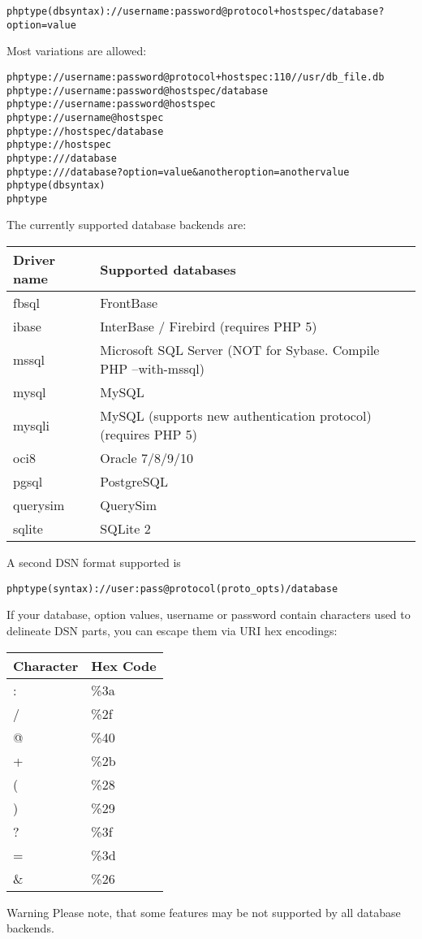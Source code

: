 \documentclass[11pt,a4paper]{report}
\begin{document}
\begin{verbatim}
phptype(dbsyntax)://username:password@protocol+hostspec/database?option=value
\end{verbatim}

Most variations are allowed:

\begin{verbatim}
phptype://username:password@protocol+hostspec:110//usr/db_file.db
phptype://username:password@hostspec/database
phptype://username:password@hostspec
phptype://username@hostspec
phptype://hostspec/database
phptype://hostspec
phptype:///database
phptype:///database?option=value&anotheroption=anothervalue
phptype(dbsyntax)
phptype
\end{verbatim}

The currently supported database backends are:

\begin{tabular}{|l|l|}
\hline
Driver name & Supported databases\\
\hline
fbsql & FrontBase\\
\hline
ibase & InterBase / Firebird (requires PHP 5)\\
\hline
mssql & Microsoft SQL Server (NOT for Sybase. Compile PHP --with-mssql)\\
\hline
mysql & MySQL\\
\hline
mysqli & MySQL (supports new authentication protocol) (requires PHP 5)\\
\hline
oci8 & Oracle 7/8/9/10\\
\hline
pgsql & PostgreSQL\\
\hline
querysim & QuerySim\\
\hline
sqlite & SQLite 2\\
\hline
\end{tabular}
A second DSN format supported is

\begin{verbatim}
phptype(syntax)://user:pass@protocol(proto_opts)/database
\end{verbatim}

If your database, option values, username or password contain characters used to delineate DSN parts, you can escape them via URI hex encodings:

\begin{tabular}{|l|l|}
\hline
Character & Hex Code\\
\hline
: & \%3a\\
\hline
/ & \%2f\\
\hline
@ & \%40\\
\hline
+ & \%2b\\
\hline
( & \%28\\
\hline
) & \%29\\
\hline
? & \%3f\\
\hline
= & \%3d\\
\hline
\& & \%26\\
\hline
\end{tabular}
Warning\newline
Please note, that some features may be not supported by all database backends.
\end{document}
